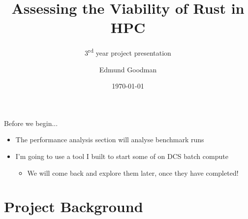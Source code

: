 \documentclass[10pt,aspectratio=169]{beamer}
\title{Assessing the Viability of Rust in HPC}
\subtitle{3\textsuperscript{rd} year project presentation}
\author{Edmund Goodman}
\date{\today}
\begin{document}
\maketitle


\begin{frame}{Before we begin...}
\begin{itemize}
    \item The performance analysis section will analyse benchmark runs
    \vspace*{0.5cm}
    \item I'm going to use a tool I built to start some of on DCS batch compute
    \begin{itemize}
        \item \alert{We will come back and explore them later, once they have completed!}
    \end{itemize}
\end{itemize}
\end{frame}

\section{Project Background}
\end{document}
